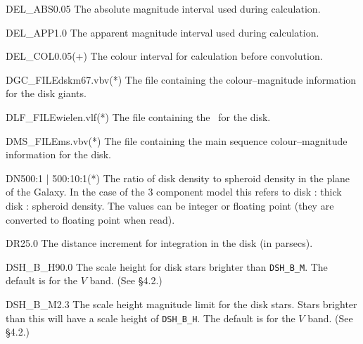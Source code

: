 \documentclass[11pt,twoside]{article}
\begin{document}
\begin{key}{DEL\_ABS}{0.05}{}
The absolute magnitude interval used during calculation.
\end{key}

\begin{key}{DEL\_APP}{1.0}{}
The apparent magnitude interval used during calculation.
\end{key}

\begin{key}{DEL\_COL}{0.05}{(+)}
The colour interval for calculation before convolution.
\end{key}

\begin{key}{DGC\_FILE}{dskm67.vbv}{(*)}
The file containing the colour--magnitude information for the disk giants.
\end{key}

\begin{key}{DLF\_FILE}{wielen.vlf}{(*)}
The file containing the \lf\ for the disk.
\end{key}

\begin{key}{DMS\_FILE}{ms.vbv}{(*)}
The file containing the main sequence colour--magnitude information for the
disk.
\end{key}

\begin{key}{DN}{500:1 | 500:10:1}{(*)}
The ratio of disk density to spheroid density in the plane of the Galaxy.
In the case of the 3 component model this refers to disk : thick disk :
spheroid density. The values can be integer or floating point (they are
converted to floating point when read).
\end{key}

\begin{key}{DR}{25.0}{}
The distance increment for integration in the disk (in parsecs).
\end{key}

\begin{key}{DSH\_B\_H}{90.0}{}
The scale height for disk stars brighter than {\tt DSH\_B\_M}. The default 
is for the $V$ band. (See \S4.2.)
\end{key}

\begin{key}{DSH\_B\_M}{2.3}{}
The scale height magnitude limit for the disk stars. Stars brighter than this
will have a scale height of {\tt DSH\_B\_H}. The default is for the $V$ band. 
(See \S4.2.)
\end{key}
\end{document}
